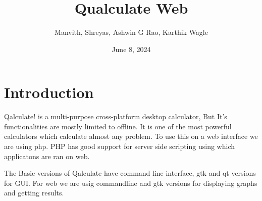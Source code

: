 \documentclass{article}
\author{Manvith, Shreyas, Ashwin G Rao, Karthik Wagle}
\date{June 8, 2024}
\title{Qualculate Web}
\begin{document}
	\maketitle \newpage
	\section{Introduction}
	\par Qalculate! is a multi-purpose cross-platform desktop calculator, But It's functionalities are mostly limited to offline. It is one of the most powerful calculators which calculate almost any problem. To use this on a web interface we are using php. PHP has good support for server side scripting using which applicatons are ran on web.

	\par The Basic versions of Qalculate have command line interface, gtk and qt versions for GUI. For web we are usig commandline and gtk versions for displaying graphs and getting results.
\end{document}
